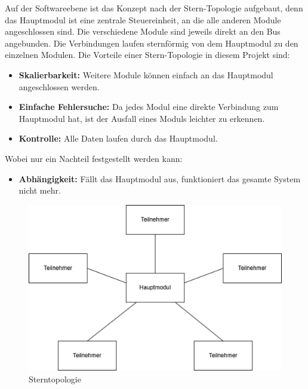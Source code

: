 Auf der Softwareebene ist das Konzept nach der Stern-Topologie aufgebaut, denn das Hauptmodul ist eine zentrale Steuereinheit, an die alle anderen Module angeschlossen sind. Die verschiedene Module sind jeweils direkt an den Bus angebunden. Die Verbindungen laufen sternförmig von dem Hauptmodul zu den einzelnen Modulen. Die Vorteile einer Stern-Topologie in diesem Projekt sind:
\begin{itemize}
    \item \textbf{Skalierbarkeit:} Weitere Module können einfach an das Hauptmodul angeschlossen werden.
    \item \textbf{Einfache Fehlersuche:} Da jedes Modul eine direkte Verbindung zum Hauptmodul hat, ist der Ausfall eines Moduls leichter zu erkennen.
    \item \textbf{Kontrolle:} Alle Daten laufen durch das Hauptmodul.
\end{itemize}
Wobei nur ein Nachteil festgestellt werden kann:
\begin{itemize}
    \item \textbf{Abhängigkeit:} Fällt das Hauptmodul aus, funktioniert das gesamte System nicht mehr.
\end{itemize}
\begin{figure}[H]
	\centering    
	\includegraphics[width=.8\textwidth]{Bilder/sterntopologie.png}
	\caption{Sterntopologie}
	\label{Sterntopologie}
\end{figure}
